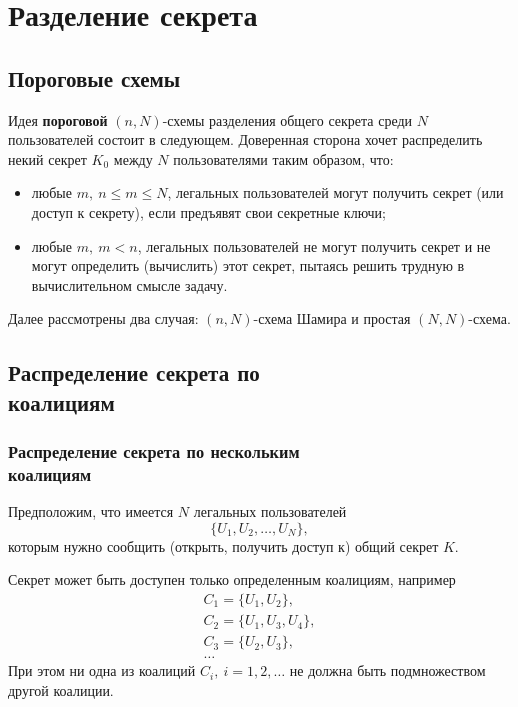 \documentclass[10pt,a4paper]{book}
\begin{document}
\chapter{Разделение секрета}

\section{Пороговые схемы}

Идея \textbf{пороговой} $(n, N)$-схемы разделения общего секрета среди $N$ пользователей состоит в следующем.
Доверенная сторона хочет распределить некий секрет $K_0$ между $N$ пользователями таким образом, что:
\begin{itemize}
    \item любые $m, ~ n \le m \le N$, легальных пользователей могут получить секрет (или доступ к секрету), если предъявят свои секретные ключи;
    \item любые $m, ~ m < n$, легальных пользователей не могут получить секрет и не могут определить (вычислить) этот секрет, пытаясь решить трудную в вычислительном смысле задачу.
\end{itemize}

Далее рассмотрены два случая: $(n, N)$-схема Шамира и простая $(N,N)$-схема.





\section[Распределение секрета по коалициям]{Распределение секрета по \protect\\ коалициям}

\subsection[Схема для нескольких коалиций]{Распределение секрета по нескольким \protect\\ коалициям}

Предположим, что имеется $N$ легальных пользователей
    \[ \{ U_1, U_2, \dots, U_N \}, \]
которым нужно сообщить (открыть, получить доступ к) общий секрет $K$.

Секрет может быть доступен только определенным коалициям, например
\[ \begin{array}{l}
    C_1 = \{ U_1, U_2 \}, \\
    C_2 = \{ U_1, U_3, U_4 \}, \\
    C_3 = \{ U_2, U_3 \}, \\
    \dots
\end{array} \]
При этом ни одна из коалиций $C_i, ~ i = 1, 2, \dots$ не должна быть подмножеством другой коалиции.
\end{document}
